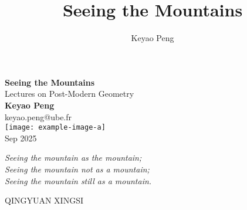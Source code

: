 \documentclass[12pt]{book}
\title{Seeing the Mountains}
\author{Keyao Peng}
\numberwithin{equation}{section}
\begin{document}
\begin{titlepage}
\begin{center}
{\huge\bfseries Seeing the Mountains \\}
{\Large Lectures on Post-Modern Geometry \\}
 \vspace{1.5cm}
 {\Large\bfseries Keyao Peng}\\[5pt]
 keyao.peng@ube.fr\\[14pt]
 \vspace{2cm}
\texttt{[image: example-image-a]}\\[5pt]
 \vfill
{Sep 2025}
\end{center}
\end{titlepage}
\clearpage

\thispagestyle{empty}
\newlength{\longest}
\settowidth{}
\null\vfill

\centering
\parbox{\longest}{%
  \raggedright{\huge\itshape%
  Seeing the mountain as the mountain; \\ 
  Seeing the mountain not as a mountain; \\ 
  Seeing the mountain still as a mountain. \par\bigskip
  }   
  \raggedleft\Large\MakeUppercase{Qingyuan Xingsi}\par%
}

\vfill\vfill

\clearpage

\tableofcontents





\end{document}
